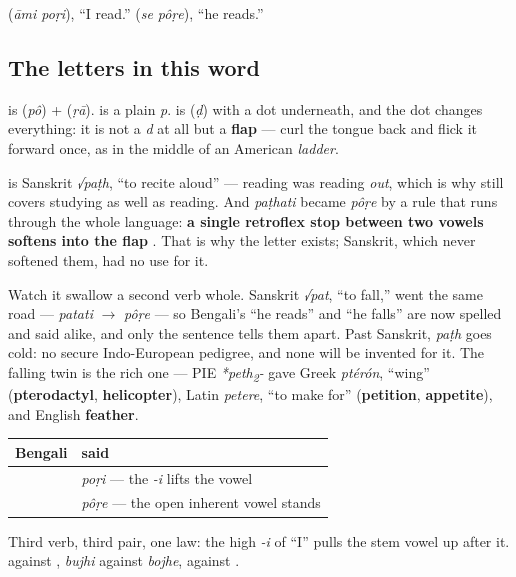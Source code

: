   (\emph{āmi poṛi}), \textquotedblleft{}I read.\textquotedblright{}   (\emph{se pôṛe}), \textquotedblleft{}he reads.\textquotedblright{}

\subsection*{The letters in this word}
\textbf{} is \textbf{} (\emph{pô}) + \textbf{} (\emph{ṛā}). \textbf{} is a plain \emph{p}. \textbf{} is \textbf{} (\emph{ḍ}) with a dot underneath, and the dot changes everything: it is not a \emph{d} at all but a \textbf{flap} — curl the tongue back and flick it forward once, as in the middle of an American \emph{ladder}.

\begin{cousinweb}
\textbf{} is Sanskrit \emph{√paṭh}, \textquotedblleft{}to recite aloud\textquotedblright{} — reading was reading \emph{out}, which is why  still covers studying as well as reading. And \emph{paṭhati} became \emph{pôṛe} by a rule that runs through the whole language: \textbf{a single retroflex stop between two vowels softens into the flap }. That is why the letter exists; Sanskrit, which never softened them, had no use for it.

Watch it swallow a second verb whole. Sanskrit \emph{√pat}, \textquotedblleft{}to fall,\textquotedblright{} went the same road — \emph{patati} $\to$ \emph{pôṛe} — so Bengali's \textquotedblleft{}he reads\textquotedblright{} and \textquotedblleft{}he falls\textquotedblright{} are now spelled and said alike, and only the sentence tells them apart. Past Sanskrit, \emph{paṭh} goes cold: no secure Indo-European pedigree, and none will be invented for it. The falling twin is the rich one — PIE \emph{*peth\textsubscript{2}-} gave Greek \emph{ptérón}, \textquotedblleft{}wing\textquotedblright{} (\textbf{pterodactyl}, \textbf{helicopter}), Latin \emph{petere}, \textquotedblleft{}to make for\textquotedblright{} (\textbf{petition}, \textbf{appetite}), and English \textbf{feather}.
\end{cousinweb}

\begin{grammarlens}[title={Grammar Lens: the harmony, on a third vowel}]
\noindent
\begin{tabularx}{\linewidth}{@{}>{\raggedright\arraybackslash}X>{\raggedright\arraybackslash}X@{}}
\toprule
\textbf{Bengali} & \textbf{said} \\
\midrule
\bn{আমি} \bn{পড়ি} & \emph{poṛi} — the \emph{-i} lifts the vowel \\
\bn{সে} \bn{পড়ে} & \emph{pôṛe} — the open inherent vowel stands \\
\bottomrule
\end{tabularx}

Third verb, third pair, one law: the high \emph{-i} of \textquotedblleft{}I\textquotedblright{} pulls the stem vowel up after it.  against , \emph{bujhi} against \emph{bojhe},  against .
\end{grammarlens}

